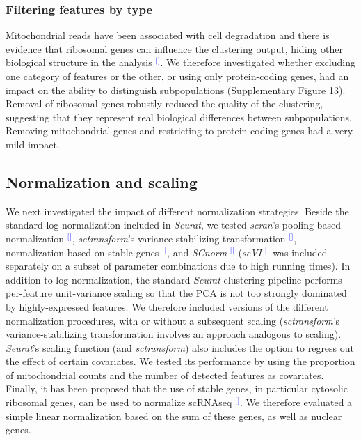 \documentclass[11pt]{article}
\renewcommand{\cite}[1]{\textcolor{Blue}{$^[$\supercite{#1}$^]$}}
\begin{document}
\subsubsection*{Filtering features by type}

Mitochondrial reads have been associated with cell degradation and there is evidence that ribosomal genes can influence the clustering output, hiding other biological structure in the analysis \cite{freytagComparison2018}. We therefore investigated whether excluding one category of features or the other, or using only protein-coding genes, had an impact on the ability to distinguish subpopulations (Supplementary Figure 13). Removal of ribosomal genes robustly reduced the quality of the clustering, suggesting that they represent real biological differences between subpopulations. Removing mitochondrial genes and restricting to protein-coding genes had a very mild impact.

\subsection*{Normalization and scaling}

We next investigated the impact of different normalization strategies. Beside the standard log-normalization included in \textit{Seurat}, we tested \textit{scran}'s pooling-based normalization \cite{lunPooling2016}, \textit{sctransform}'s variance-stabilizing transformation \cite{hafemeisterSCtransform2019}, normalization based on stable genes \cite{linStableGenes2018, deekeStablyExpressed2018}, and \textit{SCnorm} \cite{bacherSCnorm2017} (\textit{scVI} \cite{lopezDeep2018} was included separately on a subset of parameter combinations due to high running times). In addition to log-normalization, the standard \textit{Seurat} clustering pipeline performs per-feature unit-variance scaling so that the PCA is not too strongly dominated by highly-expressed features. We therefore included versions of the different normalization procedures, with or without a subsequent scaling (\textit{sctransform}'s variance-stabilizing transformation involves an approach analogous to scaling). 
\textit{Seurat}'s scaling function (and \textit{sctransform}) also includes the option to regress out the effect of certain covariates. We tested its performance by using the proportion of mitochondrial counts and the number of detected features as covariates. Finally, it has been proposed that the use of stable genes, in particular cytosolic ribosomal genes, can be used to normalize scRNAseq \cite{deekeStablyExpressed2018}. We therefore evaluated a simple linear normalization based on the sum of these genes, as well as nuclear genes.
\end{document}
